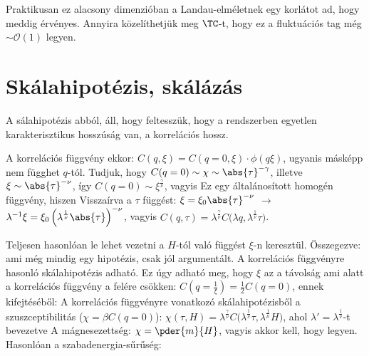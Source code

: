   Praktikusan ez alacsony dimenzióban a Landau-elméletnek egy korlátot ad, hogy meddig érvényes.
   Annyira közelíthetjük meg $\TC$-t, hogy ez a fluktuációs tag még $\sim\mathcal{O}(1)$ legyen.
  
 \section{Skálahipotézis, skálázás}
  
  A sálahipotézis abból, áll, hogy feltesszük, hogy a rendszerben egyetlen karakterisztikus hosszúság van, a korrelációs hossz. 
  
  A korrelációs függvény ekkor: $C(q,\xi)=C(q=0,\xi)\cdot\phi(q\xi)$, ugyanis másképp nem függhet $q$-tól.
   Tudjuk, hogy $C(q=0)\sim\chi\sim\abs{\tau}^{-\gamma}$, illetve $\xi\sim\abs{\tau}^{-{\nu}}$, így $C(q=0)\sim\xi^{\frac{\gamma}{\nu}}$, vagyis
  Ez egy általánosított homogén függvény, hiszen
  Visszaírva a $\tau$ függést: $\xi=\xi_0\abs{\tau}^{-\nu}$ $\rightarrow$ $\lambda^{-1}\xi=\xi_0\left(\lambda^{\frac{1}{\nu}}\abs{\tau}\right)^{-\nu}$, vagyis $C(q,\tau)=\lambda^{\frac{\gamma}{\nu}}C\big(\lambda q,\lambda^{\frac{1}{\nu}}\tau\big)$. 
  
  Teljesen hasonlóan le lehet vezetni a $H$-tól való függést $\xi$-n keresztül. Összegezve:
  ami még mindig egy hipotézis, csak jól argumentált. 
  A korrelációs függvényre hasonló skálahipotézis adható.
   Ez úgy adható meg, hogy $\xi$ az a távolság ami alatt a korrelációs függvény a felére csökken: $C(q=\frac{1}{\xi})=\frac{1}{2}C(q=0)$, ennek kifejtéséből:
  A korrelációs függvényre vonatkozó skálahipotézisből a szuszceptibilitás ($\chi=\beta C(q=0)$): $\chi(\tau,H)=\lambda^{\frac{\gamma}{\nu}}C\big(\lambda^{\frac{1}{\nu}}\tau,\lambda^{\frac{1}{\mu}}H\big)$, ahol $\lambda'=\lambda^{\frac{1}{\nu}}$-t bevezetve
  A mágnesezettség: $\chi=\pder{m}{H}$, vagyis akkor 
  kell, hogy legyen.
   Hasonlóan a szabadenergia-sűrűség:
  
